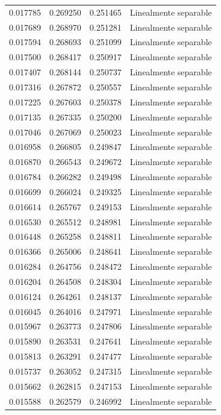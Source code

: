 \begin{tabular}{llll}
0.017785 & 0.269250 & 0.251465 & Linealmente separable \\
0.017689 & 0.268970 & 0.251281 & Linealmente separable \\
0.017594 & 0.268693 & 0.251099 & Linealmente separable \\
0.017500 & 0.268417 & 0.250917 & Linealmente separable \\
0.017407 & 0.268144 & 0.250737 & Linealmente separable \\
0.017316 & 0.267872 & 0.250557 & Linealmente separable \\
0.017225 & 0.267603 & 0.250378 & Linealmente separable \\
0.017135 & 0.267335 & 0.250200 & Linealmente separable \\
0.017046 & 0.267069 & 0.250023 & Linealmente separable \\
0.016958 & 0.266805 & 0.249847 & Linealmente separable \\
0.016870 & 0.266543 & 0.249672 & Linealmente separable \\
0.016784 & 0.266282 & 0.249498 & Linealmente separable \\
0.016699 & 0.266024 & 0.249325 & Linealmente separable \\
0.016614 & 0.265767 & 0.249153 & Linealmente separable \\
0.016530 & 0.265512 & 0.248981 & Linealmente separable \\
0.016448 & 0.265258 & 0.248811 & Linealmente separable \\
0.016366 & 0.265006 & 0.248641 & Linealmente separable \\
0.016284 & 0.264756 & 0.248472 & Linealmente separable \\
0.016204 & 0.264508 & 0.248304 & Linealmente separable \\
0.016124 & 0.264261 & 0.248137 & Linealmente separable \\
0.016045 & 0.264016 & 0.247971 & Linealmente separable \\
0.015967 & 0.263773 & 0.247806 & Linealmente separable \\
0.015890 & 0.263531 & 0.247641 & Linealmente separable \\
0.015813 & 0.263291 & 0.247477 & Linealmente separable \\
0.015737 & 0.263052 & 0.247315 & Linealmente separable \\
0.015662 & 0.262815 & 0.247153 & Linealmente separable \\
0.015588 & 0.262579 & 0.246992 & Linealmente separable \\

\end{tabular}

